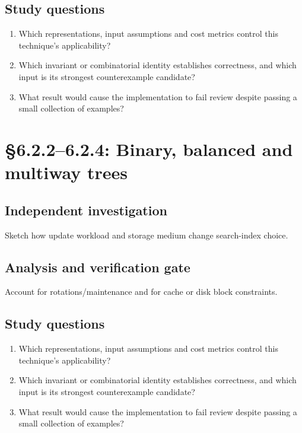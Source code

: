 \documentclass[11pt,letterpaper]{article}
\begin{document}
\subsection{Study questions}
\begin{enumerate}
\item Which representations, input assumptions and cost metrics control this technique's applicability?
\item Which invariant or combinatorial identity establishes correctness, and which input is its strongest counterexample candidate?
\item What result would cause the implementation to fail review despite passing a small collection of examples?
\end{enumerate}

\section{\S 6.2.2--6.2.4: Binary, balanced and multiway trees}
\subsection{Independent investigation}
Sketch how update workload and storage medium change search-index choice.
\subsection{Analysis and verification gate}
Account for rotations/maintenance and for cache or disk block constraints.
\subsection{Study questions}
\begin{enumerate}
\item Which representations, input assumptions and cost metrics control this technique's applicability?
\item Which invariant or combinatorial identity establishes correctness, and which input is its strongest counterexample candidate?
\item What result would cause the implementation to fail review despite passing a small collection of examples?
\end{enumerate}
\end{document}
